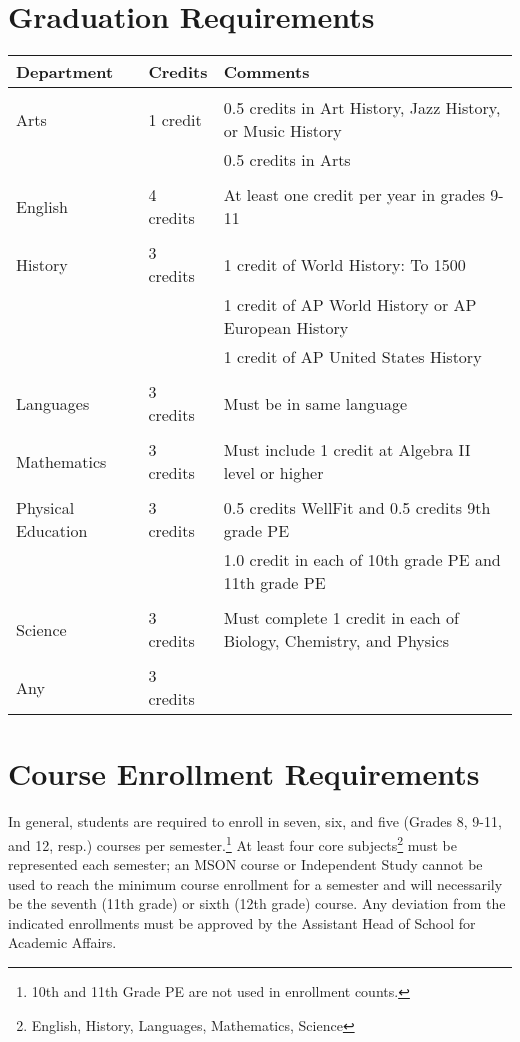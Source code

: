 \vfill


\section{Graduation Requirements}

\begin{tabular}{lll}
  Department & Credits & Comments\\
  \hline  \hline\\
  Arts & 1 credit& 0.5 credits in Art History, Jazz History, or Music History\\
   & & 0.5 credits in Arts\\  
   \\
  English &  4 credits& At least one credit per year in grades 9-11  \\
  \\
  History      &  3 credits&  1 credit of World History:  To 1500\\
              &  &  1 credit of AP World History or AP European History\\  
              &  &  1 credit of AP United States History\\       
   \\                              
  Languages  &  3 credits& Must be in same language  \\
  \\
  Mathematics   &  3 credits& Must include 1 credit at Algebra II level or higher  \\
  \\
  Physical Education   &  3 credits& 0.5 credits WellFit and 0.5 credits 9th grade PE\\
&&  1.0 credit in each of 10th grade PE and 11th grade PE  \\
\\
  Science                    &  3 credits & Must complete 1 credit in each of Biology, Chemistry, and Physics \\
  \\
  Any                        &  3 credits\\
\end{tabular}


\section{Course Enrollment Requirements}

In general, students are required to enroll in seven, six, and five (Grades 8, 9-11, and 12, resp.) courses per semester.\footnote{10th and 11th Grade PE are not used in enrollment counts.}  At least four core subjects\footnote{English, History, Languages, Mathematics, Science}  must be represented each semester; an MSON course or Independent Study cannot be used to reach the minimum course enrollment for a semester and will necessarily be the seventh (11th grade) or sixth (12th grade) course.  Any deviation from the indicated enrollments must be approved by the Assistant Head of School for Academic Affairs.

